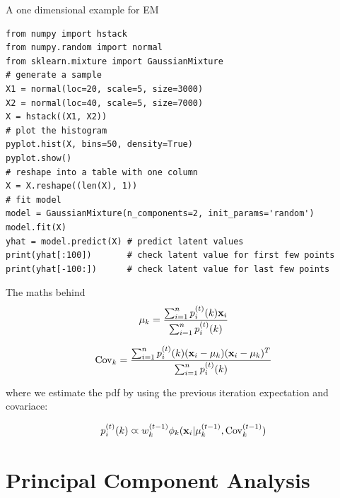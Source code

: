 \documentclass{beamer}
\begin{document}
\begin{frame}[fragile]{A one dimensional example for EM}
    \footnotesize
    \begin{lstlisting}
from numpy import hstack
from numpy.random import normal
from sklearn.mixture import GaussianMixture
# generate a sample
X1 = normal(loc=20, scale=5, size=3000)
X2 = normal(loc=40, scale=5, size=7000)
X = hstack((X1, X2))
# plot the histogram
pyplot.hist(X, bins=50, density=True)
pyplot.show()
# reshape into a table with one column
X = X.reshape((len(X), 1))
# fit model
model = GaussianMixture(n_components=2, init_params='random')
model.fit(X)
yhat = model.predict(X) # predict latent values
print(yhat[:100])       # check latent value for first few points
print(yhat[-100:])      # check latent value for last few points
    \end{lstlisting}
    \normalsize
\end{frame}

\begin{frame}{The maths behind}
    \[\mu_k = \frac{\sum_{i=1}^n p_i^{(t)}(k)\textbf{x}_i}{\sum_{i=1}^n p_i^{(t)}(k)}\]

    \[\mathrm{Cov}_k=\frac{\sum_{i=1}^n p_i^{(t)}(k)(\textbf{x}_i-\mu_k)(\textbf{x}_i-\mu_k)^T}{\sum_{i=1}^n p_i^{(t)}(k)}\]

    where we estimate the pdf by using the previous iteration expectation and covariace:

    \[p_i^{(t)}(k) \varpropto w_k^{(t-1)} \phi_k(\textbf{x}_i | \mu_k^{(t-1)},\mathrm{Cov}_k^{(t-1)})\]
\end{frame}


\section{Principal Component Analysis}
\end{document}
